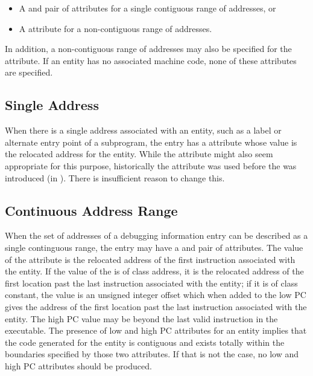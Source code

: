 \begin{itemize}
\item A  and 
 pair of 
attributes 
for 
a single contiguous range of
addresses, or

\item A  attribute 
for a non-contiguous range of addresses.
\end{itemize}

In addition, a non-contiguous range of 
addresses may also be specified for the
 attribute.
If an entity has no associated machine code, 
none of these attributes are specified.

\subsection{Single Address} 
When there is a single address associated with an entity,
such as a label or alternate entry point of a subprogram,
the entry has a  attribute whose value is the
relocated address for the entity.  While the 
attribute might also seem appropriate for this purpose,
historically the  attribute was used before the
 was introduced 
(in ). There is
insufficient reason to change this.

\subsection{Continuous Address Range}
\label{chap:contiguousaddressranges}
When the set of addresses of a debugging information entry can
be described as a single continguous range, the entry 
may 
have
a  and 
 pair of attributes. 
The value
of the 
 attribute 
is the relocated address of the
first instruction associated with the entity. If the value of
the  is of class address, it is the relocated
address of the first location past the last instruction
associated with the entity; if it is of class constant, the
value is an unsigned integer offset which when added to the
low PC gives the address of the first location past the last
instruction associated with the entity.  The high PC value
may be beyond the last valid instruction in the executable.
The presence of low and high PC attributes for an entity
implies that the code generated for the entity is contiguous
and exists totally within the boundaries specified by those
two attributes. If that is not the case, no low and high PC
attributes should be produced.

